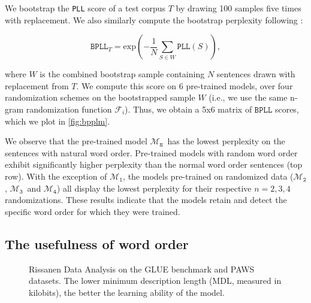 \documentclass[letterpaper, 12pt]{report}
\newcommand{\OR}{$\mathcal{M}_{\texttt{N}}$}
\newcommand{\RI}{$\mathcal{M}_{\texttt{1}}$}
\newcommand{\RII}{$\mathcal{M}_{\texttt{2}}$}
\newcommand{\RIII}{$\mathcal{M}_{\texttt{3}}$}
\newcommand{\RIV}{$\mathcal{M}_{\texttt{4}}$}
\begin{document}
We bootstrap the \texttt{PLL} score of a test corpus $T$ by drawing 100 samples five times with replacement. We also similarly compute the bootstrap perplexity  following \citeauthor{salazar2020a}:

\begin{equation}
    \texttt{BPLL}_{T} = \text{exp}( - \frac{1}{N} \sum_{S \in W} \texttt{PLL}(S)),
\end{equation}

where $W$ is the combined bootstrap sample containing $N$ sentences drawn with replacement from $T$. We compute this score on 6 pre-trained models, over four randomization schemes on the bootstrapped sample $W$ (i.e., we use the same n-gram randomization function $\mathcal{F}_i$). Thus, we obtain a 5x6 matrix of $\texttt{BPLL}$ scores, which we plot in \autoref{fig:bpplm}.

We observe that the pre-trained model \OR\ has the lowest perplexity on the sentences with natural word order. Pre-trained models with random word order exhibit significantly higher perplexity than the normal word order sentences (top row). With the exception of \RI, the models pre-trained on randomized data (\RII, \RIII\ and \RIV) all display the lowest perplexity for their respective $n=2,3,4$ randomizations. %
These results indicate that the models  retain and detect the specific word order for which they were trained.

\subsection{The usefulness of word order}
\label{sec:mlm_rda_analysis}

\begin{figure}[ht]
    \centering
    \caption{Rissanen Data Analysis \cite{perez2021} on the GLUE benchmark and PAWS datasets. The lower minimum description length (MDL, measured in kilobits), the better the learning ability of the model.}
    \label{fig:mlm_rda}
\end{figure}
\end{document}
